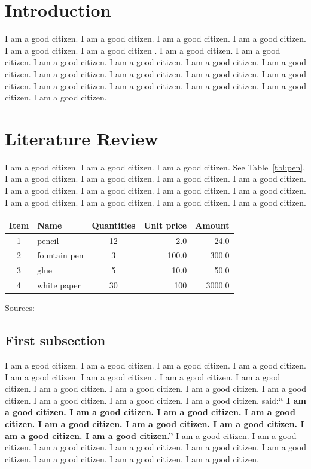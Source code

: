 \documentclass[12pt]{article}
\begin{document}
\section{Introduction}
I am a good citizen. I am a good citizen. I am a good citizen.
I am a good citizen. I am a good citizen. I am a good citizen \autocite{dirac}.
I am a good citizen. I am a good citizen. I am a good citizen.
I am a good citizen. I am a good citizen. I am a good citizen.
I am a good citizen. I am a good citizen. I am a good citizen.
I am a good citizen. I am a good citizen. I am a good citizen.
I am a good citizen. I am a good citizen. I am a good citizen.


\section{Literature Review}

I am a good citizen. I am a good citizen. I am a good citizen.
See Table~\ref{tbl:pen},
I am a good citizen. I am a good citizen. I am a good citizen.
I am a good citizen. I am a good citizen. I am a good citizen.
I am a good citizen. I am a good citizen. I am a good citizen.
I am a good citizen. I am a good citizen. I am a good citizen.

{
\begin{tabular}{clcrr}
\toprule
Item & Name & Quantities & Unit price & Amount \\
\midrule
1 & pencil  & 12 & 2.0 & 24.0 \\
2 & fountain pen & 3 & 100.0& 300.0 \\
3 & glue & 5 & 10.0 & 50.0 \\
4 & white paper & 30 & 100 & 3000.0\\
\bottomrule
\end{tabular}}
{Sources: }

\subsection{First subsection}
I am a good citizen. I am a good citizen. I am a good citizen.
I am a good citizen. I am a good citizen.
I am a good citizen \autocite{knuth-fa}.
I am a good citizen. I am a good citizen. I am a good citizen.
I am a good citizen. I am a good citizen. I am a good citizen.
I am a good citizen. I am a good citizen. I am a good citizen.
\textcite{einstein} said:\textbf{``
I am a good citizen. I am a good citizen. I am a good citizen.
I am a good citizen. I am a good citizen. I am a good citizen.
I am a good citizen. I am a good citizen. I am a good citizen.''}
I am a good citizen. I am a good citizen. I am a good citizen.
I am a good citizen. I am a good citizen. I am a good citizen.
I am a good citizen. I am a good citizen. I am a good citizen.
\end{document}
